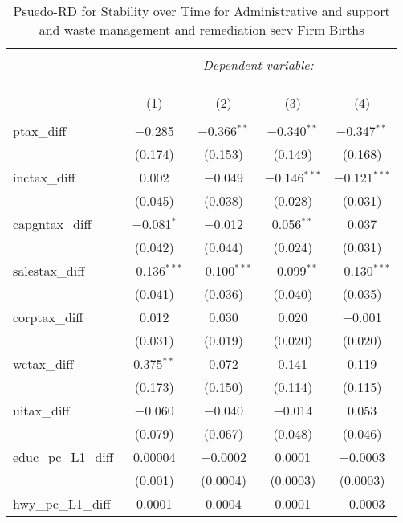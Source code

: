 
\begin{table}[!htbp] \centering 
  \caption{Psuedo-RD for Stability over Time for  Administrative and support and waste management and remediation serv Firm Births} 
  \label{} 
\begin{tabular}{@{\extracolsep{5pt}}lcccc} 
\\[-1.8ex]\hline 
\hline \\[-1.8ex] 
 & \multicolumn{4}{c}{\textit{Dependent variable:}} \\ 
\cline{2-5} 
\\[-1.8ex] & \multicolumn{4}{c}{ } \\ 
\\[-1.8ex] & (1) & (2) & (3) & (4)\\ 
\hline \\[-1.8ex] 
 ptax\_diff & $-$0.285 & $-$0.366$^{**}$ & $-$0.340$^{**}$ & $-$0.347$^{**}$ \\ 
  & (0.174) & (0.153) & (0.149) & (0.168) \\ 
  inctax\_diff & 0.002 & $-$0.049 & $-$0.146$^{***}$ & $-$0.121$^{***}$ \\ 
  & (0.045) & (0.038) & (0.028) & (0.031) \\ 
  capgntax\_diff & $-$0.081$^{*}$ & $-$0.012 & 0.056$^{**}$ & 0.037 \\ 
  & (0.042) & (0.044) & (0.024) & (0.031) \\ 
  salestax\_diff & $-$0.136$^{***}$ & $-$0.100$^{***}$ & $-$0.099$^{**}$ & $-$0.130$^{***}$ \\ 
  & (0.041) & (0.036) & (0.040) & (0.035) \\ 
  corptax\_diff & 0.012 & 0.030 & 0.020 & $-$0.001 \\ 
  & (0.031) & (0.019) & (0.020) & (0.020) \\ 
  wctax\_diff & 0.375$^{**}$ & 0.072 & 0.141 & 0.119 \\ 
  & (0.173) & (0.150) & (0.114) & (0.115) \\ 
  uitax\_diff & $-$0.060 & $-$0.040 & $-$0.014 & 0.053 \\ 
  & (0.079) & (0.067) & (0.048) & (0.046) \\ 
  educ\_pc\_L1\_diff & 0.00004 & $-$0.0002 & 0.0001 & $-$0.0003 \\ 
  & (0.001) & (0.0004) & (0.0003) & (0.0003) \\ 
  hwy\_pc\_L1\_diff & 0.0001 & 0.0004 & 0.0001 & $-$0.0003 \\ 

\end{tabular}
\end{table}
